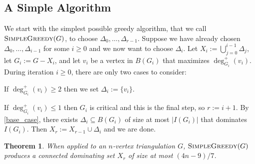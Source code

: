 \documentclass[11pt]{article}
\newtheorem{thm}{Theorem}
\theoremstyle{definition}
\begin{document}
\subsection{A Simple Algorithm}
\label{warm_up}

We start with the simplest possible greedy algorithm, that we call $\textsc{SimpleGreedy}(G)$, to choose $\Delta_0,\ldots,\Delta_{r-1}$.  Suppose we have already chosen $\Delta_0,\ldots,\Delta_{i-1}$ for some $i\ge 0$ and we now want to choose $\Delta_i$.  Let $X_i:=\bigcup_{j=0}^{i-1}\Delta_j$, let $G_i:=G-X_i$, and let $v_i$ be a vertex in $B(G_i)$ that maximizes $\deg^+_{G_i}(v_i)$.  During iteration $i\ge 0$, there are only two cases to consider:
\begin{compactenum}[{[}g1{]}]
    \item If $\deg^+_{G_i}(v_i)\ge 2$ then we set $\Delta_i := \{v_i\}$.
    \item If $\deg^+_{G_i}(v_i)\le 1$ then $G_i$ is critical and this is the final step, so $r:=i+1$.  By \cref{base_case}, there exists $\Delta_i\subseteq B(G_i)$ of size at most $|I(G_i)|$ that dominates $I(G_i)$. Then $X_r:=X_{r-1}\cup\Delta_{i}$ and we are done.
\end{compactenum}

\begin{thm}\label{simple_greedy}
  When applied to an $n$-vertex triangulation $G$,  $\textsc{SimpleGreedy}(G)$ produces a connected dominating set $X_r$ of size at most $(4n-9)/7$.
\end{thm}
\end{document}
